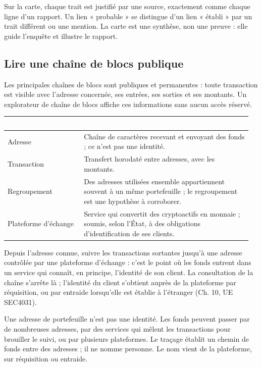 Sur la carte, chaque trait est justifié par une source, exactement comme chaque ligne d'un rapport. Un lien « probable » se distingue d'un lien « établi » par un trait différent ou une mention. La carte est une synthèse, non une preuve : elle guide l'enquête et illustre le rapport.

\subsection{Lire une chaîne de blocs publique}

Les principales chaînes de blocs sont publiques et permanentes : toute transaction est visible avec l'adresse concernée, ses entrées, ses sorties et ses montants. Un explorateur de chaîne de blocs affiche ces informations sans aucun accès réservé.

\begin{longtable}{p{0.30\linewidth}p{0.66\linewidth}}
\rowcolor{TableauEntete}\textcolor{white}{\bfseries Notion} & \textcolor{white}{\bfseries Ce qu'il faut retenir} \\ \hline
Adresse & Chaîne de caractères recevant et envoyant des fonds ; ce n'est pas une identité. \\
Transaction & Transfert horodaté entre adresses, avec les montants. \\
Regroupement & Des adresses utilisées ensemble appartiennent souvent à un même portefeuille ; le regroupement est une hypothèse à corroborer. \\
Plateforme d'échange & Service qui convertit des cryptoactifs en monnaie ; soumis, selon l'État, à des obligations d'identification de ses clients. \\
\end{longtable}

Depuis l'adresse connue, suivre les transactions sortantes jusqu'à une adresse contrôlée par une plateforme d'échange : c'est le point où les fonds entrent dans un service qui connaît, en principe, l'identité de son client. La consultation de la chaîne s'arrête là ; l'identité du client s'obtient auprès de la plateforme par réquisition, ou par entraide lorsqu'elle est établie à l'étranger (Ch. 10, UE SEC4031).

\begin{boxalert}
Une adresse de portefeuille n'est pas une identité. Les fonds peuvent passer par de nombreuses adresses, par des services qui mêlent les transactions pour brouiller le suivi, ou par plusieurs plateformes. Le traçage établit un chemin de fonds entre des adresses ; il ne nomme personne. Le nom vient de la plateforme, sur réquisition ou entraide.
\end{boxalert}

